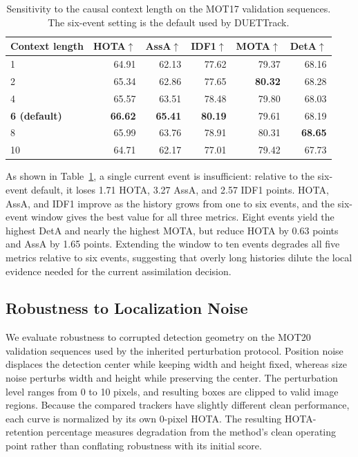 \documentclass[a4paper,fleqn]{cas-sc}
\begin{document}
\begin{table}[pos=!ht]
\centering
\caption{Sensitivity to the causal context length on the MOT17 validation sequences. The six-event setting is the default used by DUETTrack.}
\label{tab:context_ablation}
{\footnotesize
\begin{tabular*}{\textwidth}{@{\extracolsep{\fill}}lrrrrr@{}}
\toprule
Context length & HOTA$\uparrow$ & AssA$\uparrow$ & IDF1$\uparrow$ & MOTA$\uparrow$ & DetA$\uparrow$ \\
\midrule
1 & 64.91 & 62.13 & 77.62 & 79.37 & 68.16 \\
2 & 65.34 & 62.86 & 77.65 & \textbf{80.32} & 68.28 \\
4 & 65.57 & 63.51 & 78.48 & 79.80 & 68.03 \\
\textbf{6 (default)} & \textbf{66.62} & \textbf{65.41} & \textbf{80.19} & 79.61 & 68.19 \\
8 & 65.99 & 63.76 & 78.91 & 80.31 & \textbf{68.65} \\
10 & 64.71 & 62.17 & 77.01 & 79.42 & 67.73 \\
\bottomrule
\end{tabular*}}
\end{table}

As shown in Table~\ref{tab:context_ablation}, a single current event is insufficient: relative to the six-event default, it loses 1.71 HOTA, 3.27 AssA, and 2.57 IDF1 points. HOTA, AssA, and IDF1 improve as the history grows from one to six events, and the six-event window gives the best value for all three metrics. Eight events yield the highest DetA and nearly the highest MOTA, but reduce HOTA by 0.63 points and AssA by 1.65 points. Extending the window to ten events degrades all five metrics relative to six events, suggesting that overly long histories dilute the local evidence needed for the current assimilation decision.

\subsection{Robustness to Localization Noise}
We evaluate robustness to corrupted detection geometry on the MOT20 validation sequences used by the inherited perturbation protocol. Position noise displaces the detection center while keeping width and height fixed, whereas size noise perturbs width and height while preserving the center. The perturbation level ranges from 0 to 10 pixels, and resulting boxes are clipped to valid image regions. Because the compared trackers have slightly different clean performance, each curve is normalized by its own 0-pixel HOTA. The resulting HOTA-retention percentage measures degradation from the method's clean operating point rather than conflating robustness with its initial score.
\end{document}
